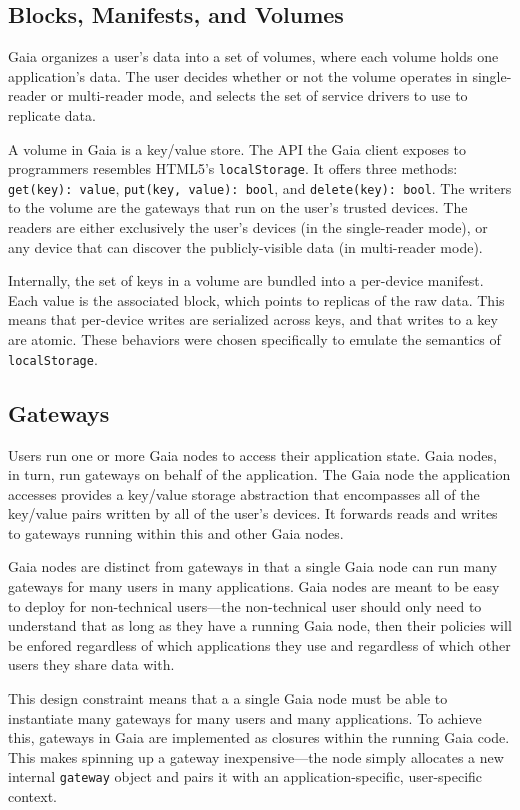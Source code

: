 \subsection{Blocks, Manifests, and Volumes}

Gaia organizes a user's data into a set of volumes, where each volume
holds one application's data.  The user decides whether or not the volume
operates in single-reader or multi-reader mode, and selects the set of
service drivers to use to replicate data.

A volume in Gaia is a key/value store.  The API the Gaia client exposes to
programmers resembles HTML5's \texttt{localStorage}.  It offers three methods:
\texttt{get(key): value}, \texttt{put(key, value): bool}, and
\texttt{delete(key): bool}.  The writers to the volume are the gateways that run
on the user's trusted devices.  The readers are either exclusively the user's
devices (in the single-reader mode), or any device that can discover the
publicly-visible data (in multi-reader mode).

Internally, the set of keys in a volume are bundled into a per-device manifest.
Each value is the associated block, which points to replicas of the raw data.
This means that per-device writes are serialized
across keys, and that writes to a key are atomic.  These behaviors were chosen
specifically to emulate the semantics of \texttt{localStorage}.

\subsection{Gateways}

Users run one or more Gaia nodes to access their application state.  Gaia nodes,
in turn, run gateways on behalf of the application.  The Gaia node the
application accesses provides a key/value storage abstraction that encompasses
all of the key/value pairs written by all of the user's devices.  It forwards
reads and writes to gateways running within this and other Gaia nodes.

Gaia nodes are distinct from gateways in that a single Gaia node can run many
gateways for many users in many applications.  Gaia nodes are meant to be easy
to deploy for non-technical users---the non-technical user should only need to
understand that as long as they have a running Gaia node, then their policies
will be enfored regardless of which applications they use and regardless of
which other users they share data with.

This design constraint means that a
a single Gaia node must be able to instantiate many gateways for many users
and many applications.  To achieve this, gateways in Gaia are implemented as
closures within the running Gaia code.  This makes spinning up a gateway
inexpensive---the node simply allocates a new internal \texttt{gateway} object
and pairs it with an application-specific, user-specific context.

